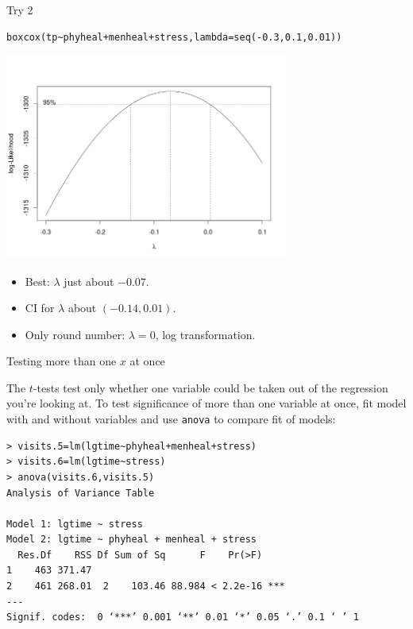 \documentclass{beamer}
\begin{document}
\begin{frame}[fragile]{Try 2}

{\footnotesize
  \begin{verbatim}
boxcox(tp~phyheal+menheal+stress,lambda=seq(-0.3,0.1,0.01))
    \end{verbatim}
}
\includegraphics[width=0.7\textwidth]{boxcox2}
\begin{itemize}
\item Best: $\lambda$ just about $-0.07$.
\item CI for $\lambda$ about $(-0.14,0.01)$.
\item Only round number: $\lambda=0$, log transformation.
\end{itemize}

\end{frame}



\begin{frame}[fragile]{Testing more than one $x$ at once}

The $t$-tests test only whether one variable could be taken out of the
regression you're looking at. To test significance of more than one
variable at once, fit model with and without variables and use
\texttt{anova} to compare fit of models:

{\small
\begin{verbatim}
> visits.5=lm(lgtime~phyheal+menheal+stress)
> visits.6=lm(lgtime~stress)
> anova(visits.6,visits.5)
Analysis of Variance Table

Model 1: lgtime ~ stress
Model 2: lgtime ~ phyheal + menheal + stress
  Res.Df    RSS Df Sum of Sq      F    Pr(>F)    
1    463 371.47                                  
2    461 268.01  2    103.46 88.984 < 2.2e-16 ***
---
Signif. codes:  0 ‘***’ 0.001 ‘**’ 0.01 ‘*’ 0.05 ‘.’ 0.1 ‘ ’ 1 
\end{verbatim}
}

\end{frame}
\end{document}
